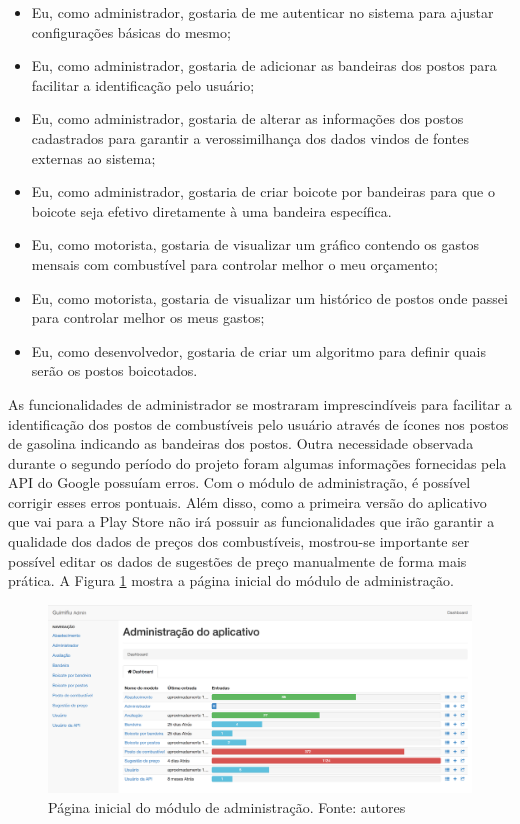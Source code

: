 \begin{itemize}
    \item Eu, como administrador, gostaria de me autenticar no sistema para ajustar configurações básicas do mesmo;
    \item Eu, como administrador, gostaria de adicionar as bandeiras dos postos para facilitar a identificação pelo usuário;
    \item Eu, como administrador, gostaria de alterar as informações dos postos cadastrados para garantir a verossimilhança dos dados vindos de fontes externas ao sistema;
    \item Eu, como administrador, gostaria de criar boicote por bandeiras para que o boicote seja efetivo diretamente à uma bandeira específica.
    \item Eu, como motorista, gostaria de visualizar um gráfico contendo os gastos mensais com combustível para controlar melhor o meu orçamento;
    \item Eu, como motorista, gostaria de visualizar um histórico de postos onde passei para controlar melhor os meus gastos;
    \item Eu, como desenvolvedor, gostaria de criar um algoritmo para definir quais serão os postos boicotados.
\end{itemize}

As funcionalidades de administrador se mostraram imprescindíveis para facilitar a identificação dos postos de combustíveis pelo usuário através de ícones nos postos de gasolina indicando as bandeiras dos postos. Outra necessidade observada durante o segundo período do projeto foram algumas informações fornecidas pela API do Google possuíam erros. Com o módulo de administração, é possível corrigir esses erros pontuais. Além disso, como a primeira versão do aplicativo que vai para a Play Store não irá possuir as funcionalidades que irão garantir a qualidade dos dados de preços dos combustíveis, mostrou-se importante ser possível editar os dados de sugestões de preço manualmente de forma mais prática. A Figura \ref{img:admin-1} mostra a página inicial do módulo de administração.

\begin{figure}[H]
    \centering
    \includegraphics[scale=0.32]{figuras/admin-1.png}
    \caption[Página inicial do módulo de administração]{Página inicial do módulo de administração. Fonte: autores}
    \label{img:admin-1}
\end{figure}

